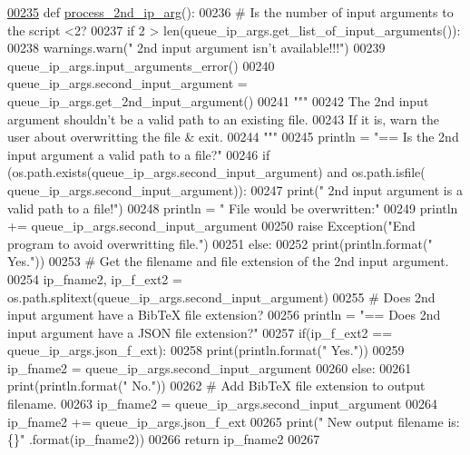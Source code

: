 \begin{DoxyCode}
\hypertarget{classutilities_1_1queue__ip__arguments_1_1queue__ip__args_l00235}{}\hyperlink{classutilities_1_1queue__ip__arguments_1_1queue__ip__args_a82d245379c48196f61d4268882dd5c6d}{00235}     \textcolor{keyword}{def }\hyperlink{classutilities_1_1queue__ip__arguments_1_1queue__ip__args_a82d245379c48196f61d4268882dd5c6d}{process\_2nd\_ip\_arg}():
00236         \textcolor{comment}{#   Is the number of input arguments to the script <2?}
00237         \textcolor{keywordflow}{if} 2 > len(queue\_ip\_args.get\_list\_of\_input\_arguments()):
00238             warnings.warn(\textcolor{stringliteral}{" 2nd input argument isn't available!!!"})
00239             queue\_ip\_args.input\_arguments\_error()
00240         queue\_ip\_args.second\_input\_argument = queue\_ip\_args.get\_2nd\_input\_argument()
00241         \textcolor{stringliteral}{"""}
00242 \textcolor{stringliteral}{        The 2nd input argument shouldn't be a valid path to an existing file.}
00243 \textcolor{stringliteral}{        If it is, warn the user about overwritting the file & exit.}
00244 \textcolor{stringliteral}{        """}
00245         println = \textcolor{stringliteral}{"==   Is the 2nd input argument a valid path to a file?"}
00246         \textcolor{keywordflow}{if} (os.path.exists(queue\_ip\_args.second\_input\_argument) \textcolor{keywordflow}{and} os.path.isfile(
      queue\_ip\_args.second\_input\_argument)):
00247             print(\textcolor{stringliteral}{" 2nd input argument is a valid path to a file!"})
00248             println = \textcolor{stringliteral}{" File would be overwritten:"}
00249             println += queue\_ip\_args.second\_input\_argument
00250             \textcolor{keywordflow}{raise} Exception(\textcolor{stringliteral}{"End program to avoid overwritting file."})
00251         \textcolor{keywordflow}{else}:
00252             print(println.format(\textcolor{stringliteral}{"  Yes."}))
00253         \textcolor{comment}{#   Get the filename and file extension of the 2nd input argument.}
00254         ip\_fname2, ip\_f\_ext2 = os.path.splitext(queue\_ip\_args.second\_input\_argument)
00255         \textcolor{comment}{#   Does 2nd input argument have a BibTeX file extension?}
00256         println = \textcolor{stringliteral}{"==   Does 2nd input argument have a JSON file extension?"}
00257         if(ip\_f\_ext2 == queue\_ip\_args.json\_f\_ext):
00258             print(println.format(\textcolor{stringliteral}{"  Yes."}))
00259             ip\_fname2 = queue\_ip\_args.second\_input\_argument
00260         \textcolor{keywordflow}{else}:
00261             print(println.format(\textcolor{stringliteral}{"  No."}))
00262             \textcolor{comment}{#   Add BibTeX file extension to output filename.}
00263             ip\_fname2 = queue\_ip\_args.second\_input\_argument
00264             ip\_fname2 += queue\_ip\_args.json\_f\_ext
00265             print(\textcolor{stringliteral}{" New output filename is: \{\}"} .format(ip\_fname2))
00266         \textcolor{keywordflow}{return} ip\_fname2
00267 \end{DoxyCode}
